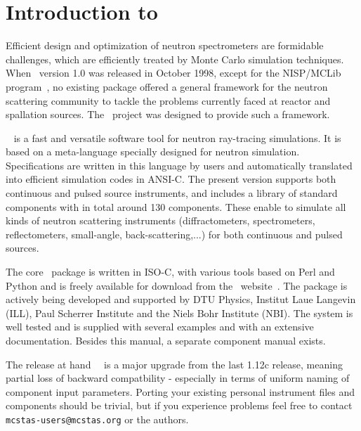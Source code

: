 
\chapter{Introduction to \MCS}

Efficient design and optimization of neutron spectrometers are
formidable challenges, which are efficiently treated by Monte Carlo
simulation techniques. 
When \MCS\ version 1.0 was released in October
1998, except for the NISP/MCLib program~\cite{nisp_webpage}, no existing package offered a general framework for the neutron
scattering community to tackle the problems currently faced at reactor and
spallation sources. The \MCS\ project was designed to provide such a framework.

\MCS\ %
is a fast and versatile software tool for neutron ray-tracing simulations.
It is based on a meta-language specially designed for neutron
simulation. Specifications are written in this language by users and
automatically translated into efficient simulation codes in ANSI-C.
The present version supports both continuous and pulsed source instruments, and includes a library of standard
components with in total around 130 components. These enable to simulate all kinds of neutron scattering instruments (diffractometers, spectrometers, reflectometers, small-angle, back-scattering,...) for both continuous and pulsed sources.

The core \MCS\ package is written in ISO-C, with various tools based
on Perl and Python and is freely available for download
from the \MCS\ website~\cite{mcstas_webpage}. The package is actively
being developed and supported by DTU Physics,
Institut Laue Langevin (ILL), Paul Scherrer Institute and the Niels
Bohr Institute (NBI).
The system is well tested and
is supplied with several examples and with an extensive documentation.
Besides this manual, a separate component manual exists.

The release at hand \MCS\ \version\ is a major upgrade from the last
1.12c release, meaning partial loss of backward compatbility -
especially in terms of uniform naming of component input
parameters. Porting your existing personal instrument files and
components should be trivial, but if you experience problems feel free
to contact  \verb+mcstas-users@mcstas.org+ or the authors.

